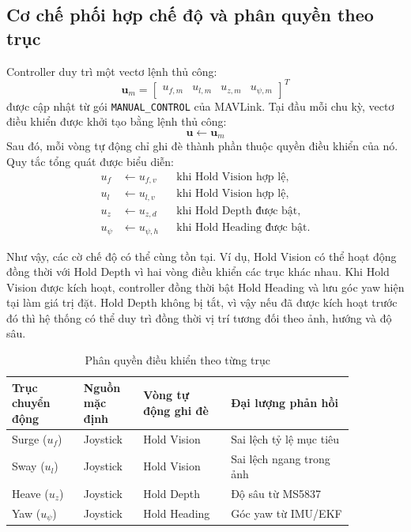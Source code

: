 \documentclass[../DoAn.tex]{subfiles}
\begin{document}
\subsection{Cơ chế phối hợp chế độ và phân quyền theo trục}

Controller duy trì một vectơ lệnh thủ công:
\[
\mathbf{u}_{m} = 
\begin{bmatrix}
u_{f,m} & u_{l,m} & u_{z,m} & u_{\psi,m}
\end{bmatrix}^{T}
\]
được cập nhật từ gói \texttt{MANUAL\_CONTROL} của MAVLink. Tại đầu mỗi chu kỳ, vectơ điều khiển được khởi tạo bằng lệnh thủ công:
\[
\mathbf{u} \longleftarrow \mathbf{u}_{m}
\]
Sau đó, mỗi vòng tự động chỉ ghi đè thành phần thuộc quyền điều khiển của nó. Quy tắc tổng quát được biểu diễn:
\[
\begin{aligned}
u_f &\longleftarrow u_{f,v} && \text{khi Hold Vision hợp lệ}, \\
u_l &\longleftarrow u_{l,v} && \text{khi Hold Vision hợp lệ}, \\
u_z &\longleftarrow u_{z,d} && \text{khi Hold Depth được bật}, \\
u_\psi &\longleftarrow u_{\psi,h} && \text{khi Hold Heading được bật}.
\end{aligned}
\]

Như vậy, các cờ chế độ có thể cùng tồn tại. Ví dụ, Hold Vision có thể hoạt động đồng thời với Hold Depth vì hai vòng điều khiển các trục khác nhau. Khi Hold Vision được kích hoạt, controller đồng thời bật Hold Heading và lưu góc yaw hiện tại làm giá trị đặt. Hold Depth không bị tắt, vì vậy nếu đã được kích hoạt trước đó thì hệ thống có thể duy trì đồng thời vị trí tương đối theo ảnh, hướng và độ sâu.

\begin{table}[htbp]
    \centering
    \caption{Phân quyền điều khiển theo từng trục}
    \label{tab:phanquyen_dieukhien}
    \renewcommand{\arraystretch}{1.3}
    \begin{tabular}{|p{0.18\linewidth}|p{0.15\linewidth}|p{0.22\linewidth}|p{0.31\linewidth}|}
        \hline
        \centering\textbf{Trục chuyển động} & \centering\textbf{Nguồn mặc định} & \centering\textbf{Vòng tự động ghi đè} & \textbf{Đại lượng phản hồi} \\
        \hline
        Surge ($u_f$) & \centering Joystick & \centering Hold Vision & Sai lệch tỷ lệ mục tiêu \\
        \hline
        Sway ($u_l$) & \centering Joystick & \centering Hold Vision & Sai lệch ngang trong ảnh \\
        \hline
        Heave ($u_z$) & \centering Joystick & \centering Hold Depth & Độ sâu từ MS5837 \\
        \hline
        Yaw ($u_\psi$) & \centering Joystick & \centering Hold Heading & Góc yaw từ IMU/EKF \\
        \hline
    \end{tabular}
\end{table}
\end{document}
